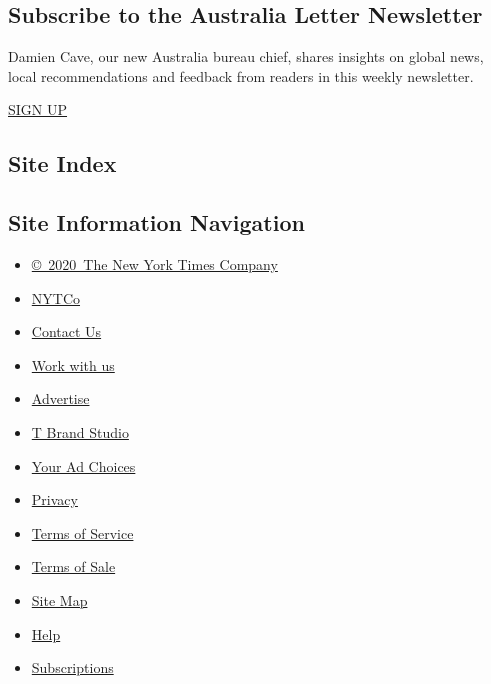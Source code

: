 \hypertarget{subscribe-to-the-australia-letter-newsletter}{%
\subsection{Subscribe to the Australia Letter
Newsletter}\label{subscribe-to-the-australia-letter-newsletter}}

Damien Cave, our new Australia bureau chief, shares insights on global
news, local recommendations and feedback from readers in this weekly
newsletter.

\href{/newsletters/signup/AUST}{SIGN UP}

\hypertarget{site-index}{%
\subsection{Site Index}\label{site-index}}

\hypertarget{site-information-navigation}{%
\subsection{Site Information
Navigation}\label{site-information-navigation}}

\begin{itemize}
\tightlist
\item
  \href{https://help.nytimes3xbfgragh.onion/hc/en-us/articles/115014792127-Copyright-notice}{©~2020~The
  New York Times Company}
\end{itemize}

\begin{itemize}
\tightlist
\item
  \href{https://www.nytco.com/}{NYTCo}
\item
  \href{https://help.nytimes3xbfgragh.onion/hc/en-us/articles/115015385887-Contact-Us}{Contact
  Us}
\item
  \href{https://www.nytco.com/careers/}{Work with us}
\item
  \href{https://nytmediakit.com/}{Advertise}
\item
  \href{http://www.tbrandstudio.com/}{T Brand Studio}
\item
  \href{https://www.nytimes3xbfgragh.onion/privacy/cookie-policy\#how-do-i-manage-trackers}{Your
  Ad Choices}
\item
  \href{https://www.nytimes3xbfgragh.onion/privacy}{Privacy}
\item
  \href{https://help.nytimes3xbfgragh.onion/hc/en-us/articles/115014893428-Terms-of-service}{Terms
  of Service}
\item
  \href{https://help.nytimes3xbfgragh.onion/hc/en-us/articles/115014893968-Terms-of-sale}{Terms
  of Sale}
\item
  \href{https://spiderbites.nytimes3xbfgragh.onion}{Site Map}
\item
  \href{https://help.nytimes3xbfgragh.onion/hc/en-us}{Help}
\item
  \href{https://www.nytimes3xbfgragh.onion/subscription?campaignId=37WXW}{Subscriptions}
\end{itemize}
